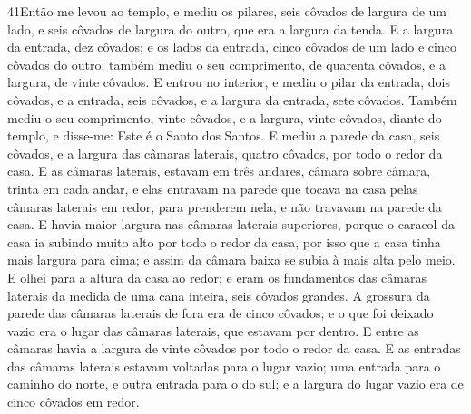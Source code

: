 \lettrine{41} Então me levou ao templo, e mediu os pilares,
seis côvados de largura de um lado, e seis côvados de largura do
outro, que era a largura da tenda. E a largura da entrada, dez
côvados; e os lados da entrada, cinco côvados de um lado e cinco
côvados do outro; também mediu o seu comprimento, de quarenta
côvados, e a largura, de vinte côvados. E entrou no interior, e
mediu o pilar da entrada, dois côvados, e a entrada, seis côvados, e
a largura da entrada, sete côvados. Também mediu o seu
comprimento, vinte côvados, e a largura, vinte côvados, diante do
templo, e disse-me: Este é o Santo dos Santos. E mediu a parede
da casa, seis côvados, e a largura das câmaras laterais, quatro
côvados, por todo o redor da casa. E as câmaras laterais,
estavam em três andares, câmara sobre câmara, trinta em cada andar,
e elas entravam na parede que tocava na casa pelas câmaras laterais
em redor, para prenderem nela, e não travavam na parede da casa.
E havia maior largura nas câmaras laterais superiores, porque o
caracol da casa ia subindo muito alto por todo o redor da casa, por
isso que a casa tinha mais largura para cima; e assim da câmara
baixa se subia à mais alta pelo meio. E olhei para a altura da
casa ao redor; e eram os fundamentos das câmaras laterais da medida
de uma cana inteira, seis côvados grandes. A grossura da parede
das câmaras laterais de fora era de cinco côvados; e o que foi
deixado vazio era o lugar das câmaras laterais, que estavam por
dentro. E entre as câmaras havia a largura de vinte côvados
por todo o redor da casa. E as entradas das câmaras laterais
estavam voltadas para o lugar vazio; uma entrada para o caminho do
norte, e outra entrada para o do sul; e a largura do lugar vazio era
de cinco côvados em redor.

